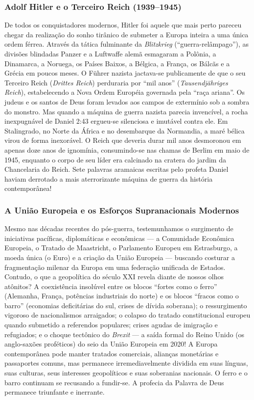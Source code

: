\documentclass[11pt,a4paper,openany]{book}
\begin{document}
\subsubsection*{Adolf Hitler e o Terceiro Reich (1939–1945)}
De todos os conquistadores modernos, Hitler foi aquele que mais perto pareceu chegar da realização do sonho tirânico de submeter a Europa inteira a uma única ordem férrea. Através da tática fulminante da \textit{Blitzkrieg} (``guerra-relâmpago''), as divisões blindadas Panzer e a Luftwaffe alemã esmagaram a Polônia, a Dinamarca, a Noruega, os Países Baixos, a Bélgica, a França, os Bálcãs e a Grécia em poucos meses. O Führer nazista jactava-se publicamente de que o seu Terceiro Reich (\textit{Drittes Reich}) perduraria por ``mil anos'' (\textit{Tausendjähriges Reich}), estabelecendo a Nova Ordem Européia governada pela ``raça ariana''. Os judeus e os santos de Deus foram levados aos campos de extermínio sob a sombra do monstro.
Mas quando a máquina de guerra nazista parecia invencível, a rocha inexpugnável de Daniel 2:43 ergueu-se silenciosa e imutável contra ele. Em Stalingrado, no Norte da África e no desembarque da Normandia, a maré bélica virou de forma inexorável. O Reich que deveria durar mil anos desmoronou em apenas doze anos de ignomínia, consumindo-se nas chamas de Berlim em maio de 1945, enquanto o corpo de seu líder era calcinado na cratera do jardim da Chancelaria do Reich. Sete palavras aramaicas escritas pelo profeta Daniel haviam derrotado a mais aterrorizante máquina de guerra da história contemporânea!


\subsubsection*{A União Europeia e os Esforços Supranacionais Modernos}
Mesmo nas décadas recentes do pós-guerra, testemunhamos o surgimento de iniciativas pacíficas, diplomáticas e econômicas — a Comunidade Econômica Europeia, o Tratado de Maastricht, o Parlamento Europeu em Estrasburgo, a moeda única (o Euro) e a criação da União Europeia — buscando costurar a fragmentação milenar da Europa em uma federação unificada de Estados.
Contudo, o que a geopolítica do século XXI revela diante de nossos olhos atônitos? A coexistência insolúvel entre os blocos ``fortes como o ferro'' (Alemanha, França, potências industriais do norte) e os blocos ``fracos como o barro'' (economias deficitárias do sul, crises de dívida soberana); o ressurgimento vigoroso de nacionalismos arraigados; o colapso do tratado constitucional europeu quando submetido a referendos populares; crises agudas de imigração e refugiados; e o choque tectônico do \textit{Brexit} — a saída formal do Reino Unido (os anglo-saxões proféticos) do seio da União Europeia em 2020!
A Europa contemporânea pode manter tratados comerciais, alianças monetárias e passaportes comuns, mas permanece irremediavelmente dividida em suas línguas, suas culturas, seus interesses geopolíticos e suas soberanias nacionais. O ferro e o barro continuam se recusando a fundir-se. A profecia da Palavra de Deus permanece triunfante e inerrante.
\end{document}
